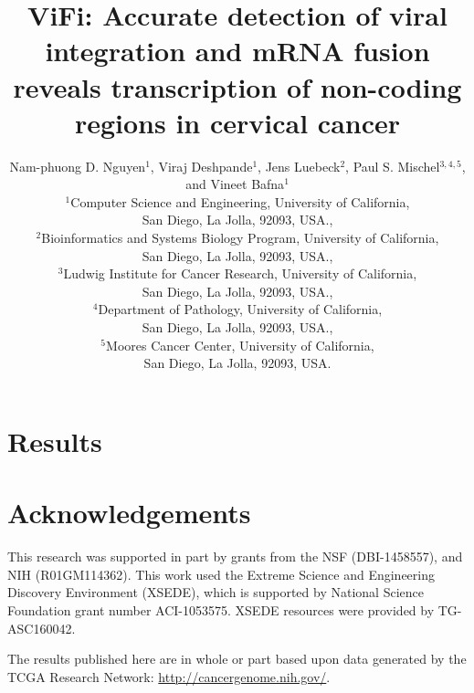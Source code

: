 \documentclass[11pt]{article}
\title{ViFi: Accurate detection of viral integration and mRNA fusion reveals transcription of non-coding regions in cervical cancer}
\author
{Nam-phuong D. Nguyen$^{1}$, Viraj Deshpande$^{1}$, 
Jens Luebeck$^{2}$, Paul S. Mischel$^{3,4,5}$, and Vineet Bafna$^{1}$\\
\normalsize{$^{1}$Computer Science and Engineering, University of California,}\\
\normalsize{San Diego, La Jolla, 92093, USA.,}\\
\normalsize{$^{2}$Bioinformatics and Systems Biology Program, University of California,}\\
\normalsize{San Diego, La Jolla, 92093, USA.,}\\
\normalsize{$^{3}$Ludwig Institute for Cancer Research, University of California,}\\
\normalsize{San Diego, La Jolla, 92093, USA.,}\\
\normalsize{$^{4}$Department of Pathology, University of California,}\\
\normalsize{San Diego, La Jolla, 92093, USA.,}\\
\normalsize{$^{5}$Moores Cancer Center, University of California,}\\
\normalsize{San Diego, La Jolla, 92093, USA.}\\
}
\date{}
\begin{document}
 


\baselineskip24pt


\maketitle 



\section*{Results}






\section*{Acknowledgements}
This research was supported in part by grants from the NSF (DBI-1458557), and NIH (R01GM114362).  This work used the Extreme Science and Engineering Discovery Environment (XSEDE), which is supported by National Science Foundation grant number ACI-1053575.  XSEDE resources were provided by TG-ASC160042.  

The results published here are in whole or part based upon data generated by the TCGA Research Network: \href{http://cancergenome.nih.gov/}{http://cancergenome.nih.gov/}.
\end{document}
